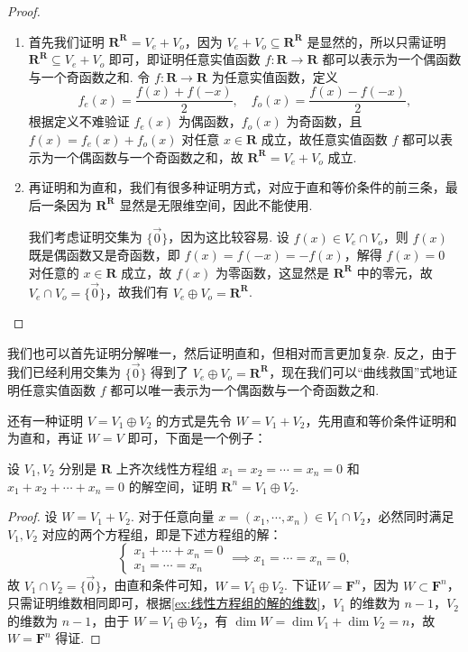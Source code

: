 \begin{proof}
    \begin{enumerate}
        \item 首先我们证明 $\mathbf{R}^\mathbf{R} = V_e + V_o$，因为 $V_e + V_o \subseteq \mathbf{R}^\mathbf{R}$ 是显然的，所以只需证明 $\mathbf{R}^\mathbf{R} \subseteq V_e + V_o$ 即可，即证明任意实值函数 $f: \mathbf{R} \to \mathbf{R}$ 都可以表示为一个偶函数与一个奇函数之和. 令 $f: \mathbf{R} \to \mathbf{R}$ 为任意实值函数，定义
        \[ f_e(x) = \frac{f(x) + f(-x)}{2}, \quad f_o(x) = \frac{f(x) - f(-x)}{2}, \]
        根据定义不难验证 $f_e(x)$ 为偶函数，$f_o(x)$ 为奇函数，且 $f(x) = f_e(x) + f_o(x)$ 对任意 $x \in \mathbf{R}$ 成立，故任意实值函数 $f$ 都可以表示为一个偶函数与一个奇函数之和，故 $\mathbf{R}^\mathbf{R} = V_e + V_o$ 成立.
        \item 再证明和为直和，我们有很多种证明方式，对应于直和等价条件的前三条，最后一条因为 $\mathbf{R}^\mathbf{R}$ 显然是无限维空间，因此不能使用.

        我们考虑证明交集为 $\{\vec{0}\}$，因为这比较容易. 设 $f(x) \in V_e \cap V_o$，则 $f(x)$ 既是偶函数又是奇函数，即 $f(x) = f(-x) = -f(x)$，解得 $f(x) = 0$ 对任意的 $x \in \mathbf{R}$ 成立，故 $f(x)$ 为零函数，这显然是 $\mathbf{R}^\mathbf{R}$ 中的零元，故 $V_e \cap V_o = \{\vec{0}\}$，故我们有 $V_e \oplus V_o = \mathbf{R}^\mathbf{R}$.
    \end{enumerate}
\end{proof}

我们也可以首先证明分解唯一，然后证明直和，但相对而言更加复杂. 反之，由于我们已经利用交集为 $\{\vec{0}\}$ 得到了 $V_e \oplus V_o = \mathbf{R}^\mathbf{R}$，现在我们可以``曲线救国''式地证明任意实值函数 $f$ 都可以唯一表示为一个偶函数与一个奇函数之和.

还有一种证明 $V = V_1 \oplus V_2$ 的方式是先令 $W = V_1 + V_2$，先用直和等价条件证明和为直和，再证 $W = V$ 即可，下面是一个例子：
\begin{example}{}{}
    设 $V_1, V_2$ 分别是 $\mathbf{R}$ 上齐次线性方程组 $x_1 = x_2 = \cdots = x_n = 0$ 和 $x_1 + x_2 + \cdots + x_n = 0$ 的解空间，证明 $\mathbf{R}^n = V_1 \oplus V_2$.
\end{example}

\begin{proof}
    设 $W = V_1 + V_2$. 对于任意向量 $x = (x_1,\cdots,x_n) \in V_1 \cap V_2$，必然同时满足 $V_1, V_2$ 对应的两个方程组，即是下述方程组的解：
    \[\begin{cases}
            x_1 + \cdots + x_n = 0 \\
            x_1= \cdots = x_n
        \end{cases} \implies x_1 = \cdots = x_n = 0,\]
    故 $V_1 \cap V_2 = \{\vec{0}\}$，由直和条件可知，$W = V_1 \oplus V_2$. 下证$W = \mathbf{F}^n$，因为 $W \subset \mathbf{F}^n$，只需证明维数相同即可，根据\autoref{ex:线性方程组的解的维数}，$V_1$ 的维数为 $n - 1$，$V_2$ 的维数为 $n - 1$，由于 $W = V_1 \oplus V_2$，有 $\dim W = \dim V_1 + \dim V_2 = n$，故 $W = \mathbf{F}^n$ 得证.
\end{proof}

